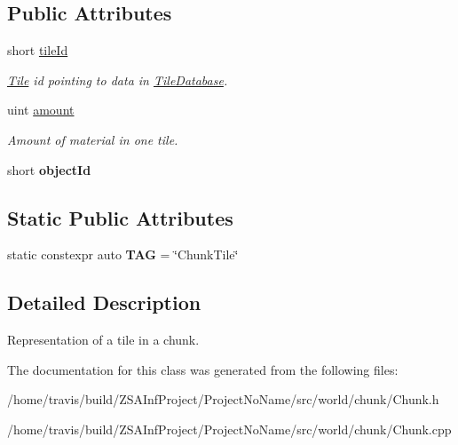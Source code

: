 \subsection*{Public Attributes}
\begin{DoxyCompactItemize}
\item 
\hypertarget{classChunkTile_ac7277fa1d196411449a646d3eed73b39}{short \hyperlink{classChunkTile_ac7277fa1d196411449a646d3eed73b39}{tile\-Id}}\label{classChunkTile_ac7277fa1d196411449a646d3eed73b39}

\begin{DoxyCompactList}\small\item\em \hyperlink{classTile}{Tile} id pointing to data in \hyperlink{classTileDatabase}{Tile\-Database}. \end{DoxyCompactList}\item 
\hypertarget{classChunkTile_a29ac3a16c7075941a5c483f1a3372364}{uint \hyperlink{classChunkTile_a29ac3a16c7075941a5c483f1a3372364}{amount}}\label{classChunkTile_a29ac3a16c7075941a5c483f1a3372364}

\begin{DoxyCompactList}\small\item\em Amount of material in one tile. \end{DoxyCompactList}\item 
\hypertarget{classChunkTile_af7c87e439222b62f7dbf791804c52381}{short {\bfseries object\-Id}}\label{classChunkTile_af7c87e439222b62f7dbf791804c52381}

\end{DoxyCompactItemize}
\subsection*{Static Public Attributes}
\begin{DoxyCompactItemize}
\item 
\hypertarget{classChunkTile_a321f107b80df537c1d2abbe36bf13df1}{static constexpr auto {\bfseries T\-A\-G} = \char`\"{}Chunk\-Tile\char`\"{}}\label{classChunkTile_a321f107b80df537c1d2abbe36bf13df1}

\end{DoxyCompactItemize}


\subsection{Detailed Description}
Representation of a tile in a chunk. 

The documentation for this class was generated from the following files\-:\begin{DoxyCompactItemize}
\item 
/home/travis/build/\-Z\-S\-A\-Inf\-Project/\-Project\-No\-Name/src/world/chunk/Chunk.\-h\item 
/home/travis/build/\-Z\-S\-A\-Inf\-Project/\-Project\-No\-Name/src/world/chunk/Chunk.\-cpp\end{DoxyCompactItemize}
